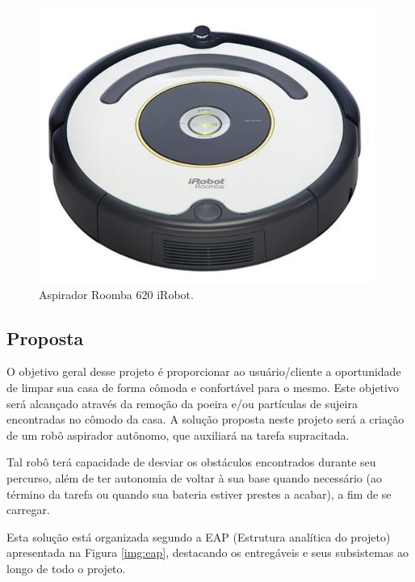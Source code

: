 \begin{itemize}
			\begin{figure}[H]
				\centering
				\includegraphics[scale=0.55]{figuras/pm_roomba.png}
				\caption{Aspirador Roomba 620 iRobot.}
				\label{img:pm_roomba}
			\end{figure}

	\end{itemize}



\subsection{Proposta} %
\label{sub:proposta}
	
	O objetivo geral desse projeto é proporcionar ao usuário/cliente a oportunidade de limpar sua casa de forma cômoda e confortável para o mesmo. Este objetivo será alcançado através da remoção da poeira e/ou partículas de sujeira encontradas no cômodo da casa. A solução proposta neste projeto será a criação de um robô aspirador autônomo, que auxiliará na tarefa supracitada. 

	Tal robô terá capacidade de desviar os obstáculos encontrados durante seu percurso, além de ter autonomia de voltar à sua base quando necessário (ao término da tarefa ou quando sua bateria estiver prestes a acabar), a fim de se carregar.

	Esta solução está organizada segundo a EAP (Estrutura analítica do projeto) apresentada na Figura \ref{img:eap}, destacando os entregáveis e seus subsistemas ao longo de todo o projeto.
	
